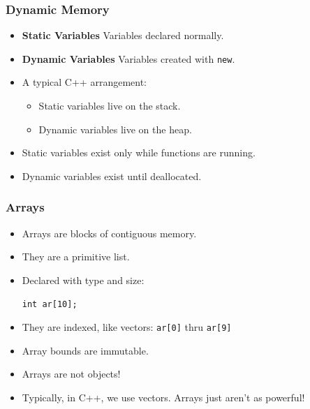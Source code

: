 \documentclass{beamer}
\begin{document}
\begin{frame}
    \frametitle{Dynamic Memory}
    \begin{itemize}
        \item {\bf Static Variables} Variables declared normally.
        \item {\bf Dynamic Variables} Variables created with {\tt new}.
        \item A typical C++ arrangement:
        \begin{itemize}
            \item Static variables live on the stack.
            \item Dynamic variables live on the heap.
        \end{itemize}
        \item Static variables exist only while functions are running.
        \item Dynamic variables exist until deallocated.
    \end{itemize}
\end{frame}

\begin{frame}
    \frametitle{Arrays}
    \begin{itemize}
        \item Arrays are blocks of contiguous memory.
        \item They are a primitive list.
        \item Declared with type and size:
              \par {\tt int ar[10];}
        \item They are indexed, like vectors: {\tt ar[0]} thru {\tt ar[9]}
        \item Array bounds are immutable.
        \item Arrays are not objects!
        \item Typically, in C++, we use vectors.  Arrays just aren't as
            powerful!
    \end{itemize}
\end{frame}
\end{document}
